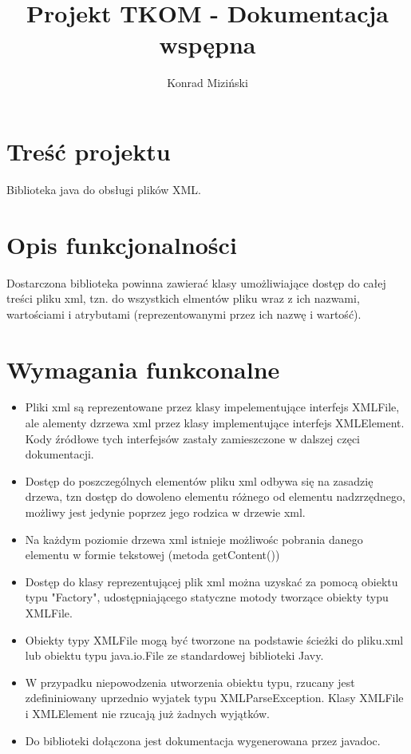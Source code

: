 \documentclass{article}
\author{Konrad Miziński}
\title{Projekt TKOM - Dokumentacja wspępna}
\begin{document}
\maketitle

\section{Treść projektu}
Biblioteka java do obsługi plików XML.

\section{Opis funkcjonalności}
Dostarczona biblioteka powinna zawierać klasy umożliwiające dostęp do całej treści pliku xml,
tzn. do wszystkich elmentów pliku wraz z ich nazwami, wartościami i atrybutami (reprezentowanymi przez ich nazwę i wartość).

\section{Wymagania funkconalne}
\begin{itemize}
	\item Pliki xml są reprezentowane przez klasy impelementujące interfejs XMLFile,
	ale alementy dzrzewa xml przez klasy implementujące interfejs XMLElement.
	Kody źródłowe tych interfejsów zastały zamieszczone w dalszej częci dokumentacji.
	\item Dostęp do poszczególnych elementów pliku xml odbywa się na zasadzię drzewa,
	tzn dostęp do dowoleno elementu różnego od elementu nadzrzędnego,
	możliwy jest jedynie poprzez jego rodzica w drzewie xml.
	\item Na każdym poziomie drzewa xml istnieje możliwośc pobrania danego elementu w formie tekstowej
	(metoda getContent())
	\item Dostęp do klasy reprezentującej plik xml można uzyskać za pomocą obiektu typu "Factory",
	udostępniającego statyczne motody tworzące obiekty typu XMLFile.
	\item Obiekty typy XMLFile mogą być tworzone na podstawie ścieżki do pliku.xml
	lub obiektu typu java.io.File ze standardowej biblioteki Javy.
	\item W przypadku niepowodzenia utworzenia obiektu typu, rzucany jest zdefininiowany uprzednio
	wyjatek typu XMLParseException. Klasy XMLFile i XMLElement nie rzucają już żadnych wyjątków.
	\item Do biblioteki dołączona jest dokumentacja wygenerowana przez javadoc.	
\end{itemize}
\end{document}
